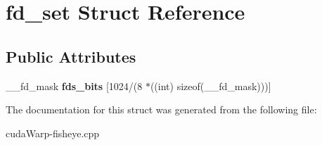 \hypertarget{structfd__set}{}\section{fd\+\_\+set Struct Reference}
\label{structfd__set}
\subsection*{Public Attributes}
\begin{DoxyCompactItemize}
\item 
\+\_\+\+\_\+fd\+\_\+mask {\bfseries fds\+\_\+bits} \mbox{[}1024/(8 $\ast$((int) sizeof(\+\_\+\+\_\+fd\+\_\+mask)))\mbox{]}\hypertarget{structfd__set_aaa66a3d3dfbee8f48dd835a1950f361f}{}\label{structfd__set_aaa66a3d3dfbee8f48dd835a1950f361f}

\end{DoxyCompactItemize}


The documentation for this struct was generated from the following file\+:\begin{DoxyCompactItemize}
\item 
cuda\+Warp-\/fisheye.\+cpp\end{DoxyCompactItemize}
